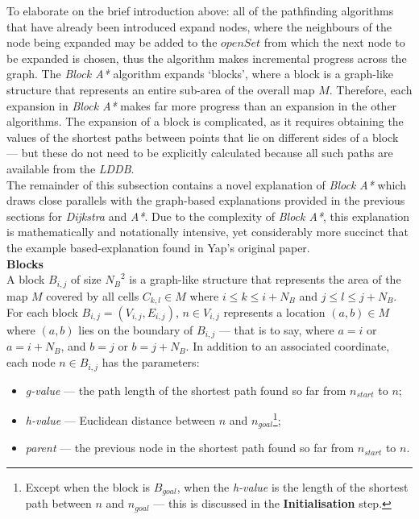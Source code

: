 \documentclass[12pt,notitlepage]{report}
\begin{document}
\noindent
To elaborate on the brief introduction above: all of the pathfinding algorithms that have already been introduced expand nodes, where the neighbours of the node being expanded may be added to the $openSet$ from which the next node to be expanded is chosen, thus the algorithm makes incremental progress across the graph. The {\em Block A*} algorithm expands `blocks', where a block is a graph-like structure that represents an entire sub-area of the overall map $M$. Therefore, each expansion in {\em Block A*} makes far more progress than an expansion in the other algorithms. The expansion of a block is complicated, as it requires obtaining the values of the shortest paths between points that lie on different sides of a block --- but these do not need to be explicitly calculated because all such paths are available from the {\em LDDB}.\\

\noindent
The remainder of this subsection contains a novel explanation of {\em Block A*} which draws close parallels with the graph-based explanations provided in the previous sections for {\em Dijkstra} and {\em A*}. Due to the complexity of {\em Block A*}, this explanation is mathematically and notationally intensive, yet considerably more succinct that the example based-explanation found in Yap's original paper\cite{Yap11}.\\

\noindent
{\bfseries Blocks}\\
\noindent
A block $B_{i,j}$ of size ${N_{B}}^{2}$ is a graph-like structure that represents the area of the map $M$ covered by all cells $C_{k,l} \in M$ where $i \leq k \leq i+N_{B}$ and $j \leq l \leq j+N_{B}$.\\

\noindent
For each block $B_{i,j} = (V_{i,j},E_{i,j})$, $n \in V_{i,j}$ represents a location $(a,b) \in M$ where $(a,b)$ lies on the boundary of $B_{i,j}$ --- that is to say, where $a=i$ or $a=i+N_{B}$, and $b=j$ or $b=j+N_{B}$. In addition to an associated coordinate, each node $n \in B_{i,j}$ has the parameters:
\begin{itemize}
\item {\em g-value} --- the path length of the shortest path found so far from $n_{start}$ to $n$;
\item {\em h-value} --- Euclidean distance between $n$ and $n_{goal}$\footnote{Except when the block is $B_{goal}$, when the {\em h-value} is the length of the shortest path between $n$ and $n_{goal}$ --- this is discussed in the {\bfseries Initialisation} step.};
\item {\em parent} --- the previous node in the shortest path found so far from $n_{start}$ to $n$.
\end{itemize}
\end{document}
